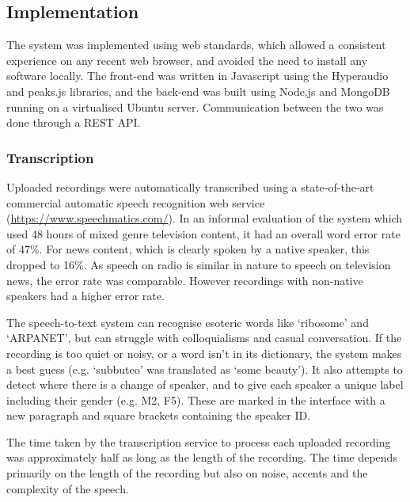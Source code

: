 \subsection{Implementation}
The system was implemented using web standards, which allowed a consistent
experience on any recent web browser, and avoided the need to install any
software locally. The front-end was written in Javascript using the Hyperaudio
\cite{Hyperaudio} and peaks.js \cite{Peaks} libraries, and the back-end was
built using Node.js and MongoDB running on a virtualised Ubuntu server.
Communication between the two was done through a REST API.

\subsubsection{Transcription}
Uploaded recordings were automatically transcribed using a state-of-the-art
commercial automatic speech recognition web
service (\url{https://www.speechmatics.com/}).
In an informal evaluation of the system which used 48 hours of mixed genre
television content, it had an overall word error rate of 47\%.  For
news content, which is clearly spoken by a native speaker, this dropped to
16\%. As speech on radio is similar in nature to speech on television news, the
error rate was comparable. However recordings with non-native speakers had a
higher error rate.

The speech-to-text system can recognise esoteric words like `ribosome' and
`ARPANET', but can struggle with colloquialisms and casual conversation. If the
recording is too quiet or noisy, or a word isn't in its dictionary, the system
makes a best guess (e.g.  `subbuteo' was translated as `some beauty'). It also
attempts to detect where there is a change of speaker, and to give each speaker
a unique label including their gender (e.g. M2, F5). These are marked in the
interface with a new paragraph and square brackets containing the speaker ID.

The time taken by the transcription service to process each uploaded recording
was approximately half as long as the length of the recording.  The time
depends primarily on the length of the recording but also on noise, accents and
the complexity of the speech.


